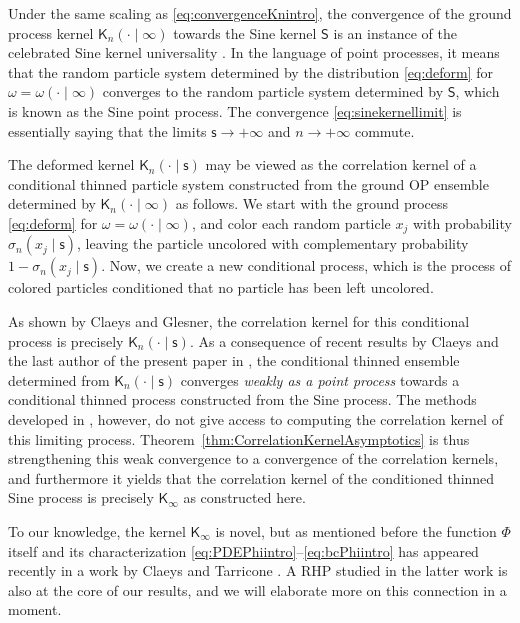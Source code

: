 \documentclass[reqno,a4paper,11pt]{amsart}
\newcommand{\msf}{\mathsf}
\newcommand{\sad}{\msf s}
\theoremstyle{definition}
\theoremstyle{remark}
\numberwithin{equation}{section}
\begin{document}
Under the same scaling as \eqref{eq:convergenceKnintro}, the convergence of the ground process kernel $\msf K_n(\cdot\mid \infty)$ towards the Sine kernel $\msf S$ is an instance of the celebrated Sine kernel universality \cite{deift_book, pastur_shcherbina_universality, Erdoes2017a}. In the language of point processes, it means that the random particle system determined by the distribution \eqref{eq:deform} for $\omega=\omega(\cdot\mid \infty)$ converges to the random particle system determined by $\msf S$, which is known as the Sine point process. The convergence \eqref{eq:sinekernellimit} is essentially saying that the limits $\sad\to +\infty$ and $n\to +\infty$ commute. 

The deformed kernel $\msf K_n(\cdot\mid \sad)$ may be viewed as the correlation kernel of a conditional thinned particle system constructed from the ground OP ensemble determined by $\msf K_n(\cdot\mid \infty)$ as follows. We start with the ground process \eqref{eq:deform} for $\omega=\omega(\cdot\mid \infty)$, and color each random particle $x_j$ with probability $\sigma_n(x_j\mid \sad)$, leaving the particle uncolored with complementary probability $1-\sigma_n(x_j\mid \sad)$. Now, we create a new conditional process, which is the process of colored particles conditioned that no particle has been left uncolored. 

As shown by Claeys and Glesner, the correlation kernel for this conditional process is precisely $\msf K_n(\cdot\mid \sad)$. As a consequence of recent results by Claeys and the last author of the present paper in \cite[Section~3.1]{ClaeysSilva2024}, the conditional thinned ensemble determined from $\msf K_n(\cdot\mid \sad)$ converges {\it weakly as a point process} towards a conditional thinned process constructed from the Sine process. The methods developed in \cite{ClaeysSilva2024}, however, do not give access to computing the correlation kernel of this limiting process. Theorem~\ref{thm:CorrelationKernelAsymptotics} is thus strengthening this weak convergence to a convergence of the correlation kernels, and furthermore it yields that the correlation kernel of the conditioned thinned Sine process is precisely $\msf K_\infty$ as constructed here.

To our knowledge, the kernel $\msf K_\infty$ is novel, but as mentioned before the function $\msf \Phi$ itself and its characterization \eqref{eq:PDEPhiintro}--\eqref{eq:bcPhiintro} has appeared recently in a work by Claeys and Tarricone \cite{ClaeysTarricone24}. A RHP studied in the latter work is also at the core of our results, and we will elaborate more on this connection in a moment.
\end{document}
